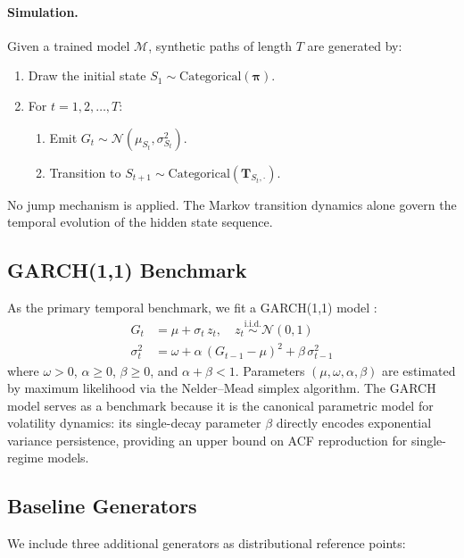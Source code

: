 \paragraph{Simulation.}
Given a trained model $\mathcal{M}$, synthetic paths of length $T$ are generated by:
\begin{enumerate}
    \item Draw the initial state $S_1 \sim \text{Categorical}(\boldsymbol{\pi})$.
    \item For $t = 1, 2, \ldots, T$:
    \begin{enumerate}
        \item Emit $G_t \sim \mathcal{N}(\mu_{S_t}, \sigma_{S_t}^2)$.
        \item Transition to $S_{t+1} \sim \text{Categorical}(\mathbf{T}_{S_t, \cdot})$.
    \end{enumerate}
\end{enumerate}
No jump mechanism is applied.
The Markov transition dynamics alone govern the temporal evolution of the hidden state sequence.

\subsection{GARCH(1,1) Benchmark}
\label{sec:garch}

As the primary temporal benchmark, we fit a GARCH(1,1) model \citep{bollerslev1986generalized}:
\begin{align}
    G_t &= \mu + \sigma_t\, z_t, \quad z_t \overset{\text{i.i.d.}}{\sim} \mathcal{N}(0,1) \label{eq:garch_mean} \\
    \sigma_t^2 &= \omega + \alpha\, (G_{t-1} - \mu)^2 + \beta\, \sigma_{t-1}^2 \label{eq:garch_var}
\end{align}
where $\omega > 0$, $\alpha \geq 0$, $\beta \geq 0$, and $\alpha + \beta < 1$.
Parameters $(\mu, \omega, \alpha, \beta)$ are estimated by maximum likelihood via the Nelder--Mead simplex algorithm.
The GARCH model serves as a benchmark because it is the canonical parametric model for volatility dynamics: its single-decay parameter $\beta$ directly encodes exponential variance persistence, providing an upper bound on ACF reproduction for single-regime models.

\subsection{Baseline Generators}
\label{sec:baselines}

We include three additional generators as distributional reference points:

